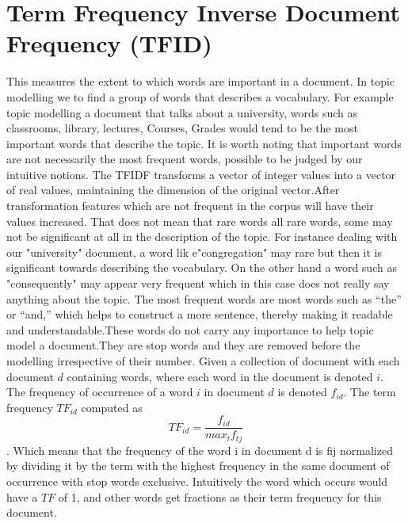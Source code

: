 \section{Term Frequency Inverse Document Frequency (TFID)}
This measures the extent to which words are important in a document.  In topic modelling we to find a group of words that describes a vocabulary. For example topic modelling a document that talks about a university, words such as classrooms, library, lectures, Courses, Grades would tend to be the most important words that describe the topic. It is worth noting that important words are not necessarily the most frequent words, possible to be judged by our intuitive notions. The TFIDF transforms a vector of integer values into a vector of real values, maintaining the dimension of the original vector.After transformation  features which are not frequent in the corpus will have their values increased. That does not mean that rare words all rare words, some may not be significant at all in the description of the topic.
For instance dealing with our "university" document, a word lik e"congregation" may rare but then it is significant towards describing the vocabulary. On the other hand a word such as "consequently" may appear very frequent which in this case does not really say anything about the topic. The most frequent words are
most words such as “the” or “and,” which helps to construct a more sentence, thereby making it readable and understandable.These words do not carry any importance to help topic model a document.They are stop words and they are removed before the modelling irrespective of their number. Given a collection of document with each document $d$ containing words, where each word in the document is denoted $i$. The frequency of occurrence of a word $i$ in document $d$ is denoted $f_{id}$. The term frequency $TF_{id}$ computed as
$$TF_{id}=\frac{f_{id}}{max_tf_{tj}}$$.
Which means that the  frequency of the word  i in document d is fij normalized by dividing
it by the term with the highest frequency in the same document of occurrence with stop words exclusive.
Intuitively the word which occurs would have a $TF$ of 1,
and other words get fractions as their term frequency for this
document.
